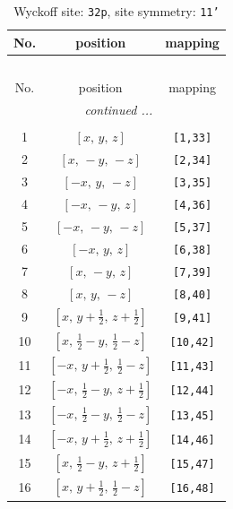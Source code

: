 \documentclass[fleqn,8pt]{jsarticle}
\begin{document}
\renewcommand{\arraystretch}{1.2}
\begin{longtable}{ccc}
\caption{Wyckoff site: {\tt 32p}, site symmetry: {\tt 11'}}
 \\
 \hline \hline
No. & position & mapping \\ \hline \endfirsthead

\multicolumn{2}{l}{\tablename\ \thetable{}} \\
 \hline \hline
No. & position & mapping \\ \hline \endhead

 \hline \hline
\multicolumn{2}{r}{\footnotesize\it continued ...} \\ \endfoot

 \hline \hline
\multicolumn{2}{r}{} \\ \endlastfoot

1 & $\left[ x,\, y,\, z \right]$ & {\tt [1,33]} \\ \hline
2 & $\left[ x,\, - y,\, - z \right]$ & {\tt [2,34]} \\ \hline
3 & $\left[ - x,\, y,\, - z \right]$ & {\tt [3,35]} \\ \hline
4 & $\left[ - x,\, - y,\, z \right]$ & {\tt [4,36]} \\ \hline
5 & $\left[ - x,\, - y,\, - z \right]$ & {\tt [5,37]} \\ \hline
6 & $\left[ - x,\, y,\, z \right]$ & {\tt [6,38]} \\ \hline
7 & $\left[ x,\, - y,\, z \right]$ & {\tt [7,39]} \\ \hline
8 & $\left[ x,\, y,\, - z \right]$ & {\tt [8,40]} \\ \hline
9 & $\left[ x,\, y + \frac{1}{2},\, z + \frac{1}{2} \right]$ & {\tt [9,41]} \\ \hline
10 & $\left[ x,\, \frac{1}{2} - y,\, \frac{1}{2} - z \right]$ & {\tt [10,42]} \\ \hline
11 & $\left[ - x,\, y + \frac{1}{2},\, \frac{1}{2} - z \right]$ & {\tt [11,43]} \\ \hline
12 & $\left[ - x,\, \frac{1}{2} - y,\, z + \frac{1}{2} \right]$ & {\tt [12,44]} \\ \hline
13 & $\left[ - x,\, \frac{1}{2} - y,\, \frac{1}{2} - z \right]$ & {\tt [13,45]} \\ \hline
14 & $\left[ - x,\, y + \frac{1}{2},\, z + \frac{1}{2} \right]$ & {\tt [14,46]} \\ \hline
15 & $\left[ x,\, \frac{1}{2} - y,\, z + \frac{1}{2} \right]$ & {\tt [15,47]} \\ \hline
16 & $\left[ x,\, y + \frac{1}{2},\, \frac{1}{2} - z \right]$ & {\tt [16,48]} \\ \hline

\end{longtable}
\end{document}
